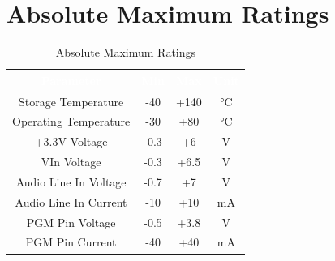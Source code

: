 \documentclass[a4paper, 10pt]{article}
\begin{document}
\section{Absolute Maximum Ratings}
\begin{table}[h!]
\centering
{
\begin{tabular}{|c|c|c|c|}
\hline
\rowcolor{gray}\textcolor{white}{\Large\textbf{Parameter}} & \textcolor{white}{\Large\textbf{Min}} & \textcolor{white}{\Large\textbf{Max}} & \textcolor{white}{\Large\textbf{Unit}}\\
\hline
Storage Temperature & -40 & +140 & °C\\
\hline
Operating Temperature & -30 & +80 & °C\\
\hline
+3.3V Voltage & -0.3 & +6 & V\\
\hline
VIn Voltage & -0.3 & +6.5 & V\\
\hline
Audio Line In Voltage & -0.7 & +7 & V\\
\hline
Audio Line In Current & -10 & +10 & mA\\
\hline
PGM Pin Voltage & -0.5 & +3.8 & V\\
\hline
PGM Pin Current & -40 & +40 & mA\\
\hline
\end{tabular}}
\caption{Absolute Maximum Ratings}
\end{table}
\end{document}

